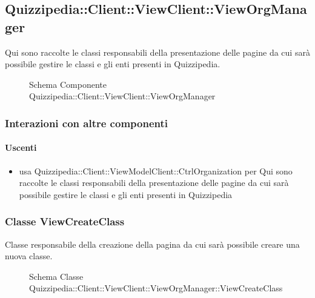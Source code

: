 \subsection{Quizzipedia::Client::ViewClient::ViewOrgManager}
Qui sono raccolte le classi responsabili della presentazione delle pagine da cui sarà possibile gestire le classi e gli enti presenti in Quizzipedia.
\begin{figure}[H]
\centering
\noindent{}
\caption[Schema Componente Quizzipedia::Client::ViewClient::ViewOrgManager]{Schema Componente Quizzipedia::Client::ViewClient::ViewOrgManager}
\end{figure}
\subsubsection{Interazioni con altre componenti}
\paragraph{Uscenti}
\begin{itemize}
\item usa Quizzipedia::Client::ViewModelClient::CtrlOrganization per Qui sono raccolte le classi responsabili della presentazione delle pagine da cui sarà possibile gestire le classi e gli enti presenti in Quizzipedia
\end{itemize}
\subsubsection{Classe ViewCreateClass}
Classe responsabile della creazione della pagina da cui sarà possibile creare una nuova classe.
\begin{figure}[H]
\centering
\noindent{}
\caption[Schema Classe ViewCreateClass]{Schema Classe Quizzipedia::Client::ViewClient::ViewOrgManager::ViewCreateClass}
\end{figure}
